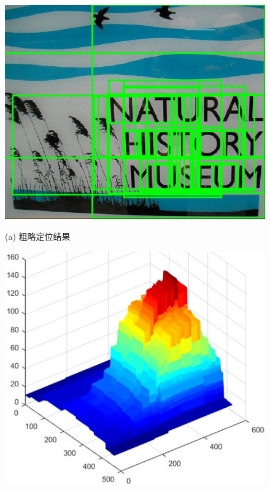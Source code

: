         \begin{figure}[!h]
        \begin{minipage}[t]{0.37\linewidth}
        \centering
        \includegraphics[width=\textwidth]{./figures/c4_img.jpg}
        \centerline{\small (a) 粗略定位结果}
        \end{minipage}
        \begin{minipage}[t]{0.35\linewidth}
        \centering
        \includegraphics[width=\textwidth]{./figures/c4_static_skeleton_response.jpg}

\end{minipage}
\end{figure}

